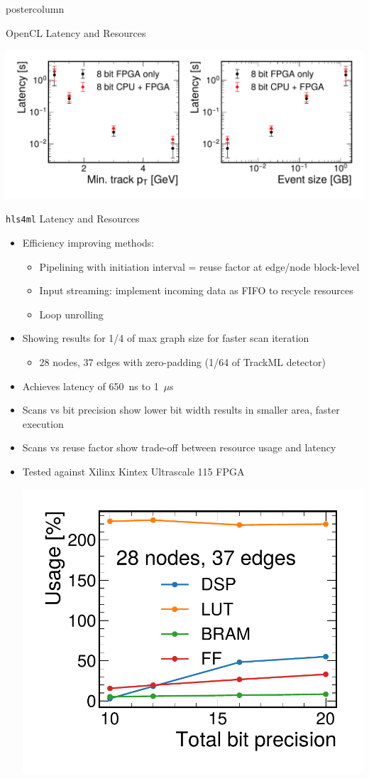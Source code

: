 \documentclass[final,hyperref={pdfpagelabels=false}]{beamer}
\newcommand{\hlsfml}{{\texttt{hls4ml}}\xspace}
\newcommand{\ptmin}{\ensuremath{p_{\mathrm{T_{min}}}}\xspace}
\begin{document}
\begin{frame}
\begin{columns}
\begin{column}{.49\textwidth}
\begin{beamercolorbox}[center,wd=\textwidth]{postercolumn}
\begin{minipage}[T]{.95\textwidth}
{\begin{block}{OpenCL Latency and Resources}
\begin{center}
                \includegraphics[width=0.66\linewidth]{figures/scalability_study_v2.pdf}
              \end{center}
            \end{block}
            
            \begin{block}{{\hlsfml} Latency and Resources}
              \begin{itemize}
                \item Efficiency improving methods:
                \begin{itemize}
                    \item Pipelining with initiation interval = reuse factor at edge/node block-level
                    \item Input streaming: implement incoming data as FIFO to recycle resources
                    \item Loop unrolling
                \end{itemize}
                \vspace{6mm}
                \item Showing results for 1/4 of max graph size for faster scan iteration
                \begin{itemize}
                    \item 28 nodes, 37 edges with zero-padding (1/64 of TrackML detector)
                \end{itemize}
                \item Achieves latency of 650~ns to 1~$\mu$s
                \item Scans vs bit precision show lower bit width results in smaller area, faster execution
                \item Scans vs reuse factor show trade-off between resource usage and latency
                \item Tested against Xilinx Kintex Ultrascale 115 FPGA
                \begin{center}
                    \includegraphics[width=0.33\linewidth]{figures/Resources_vs_BP.pdf}

\end{center}
\end{itemize}
\end{block}}
\end{minipage}
\end{beamercolorbox}
\end{column}
\end{columns}
\end{frame}
\end{document}
